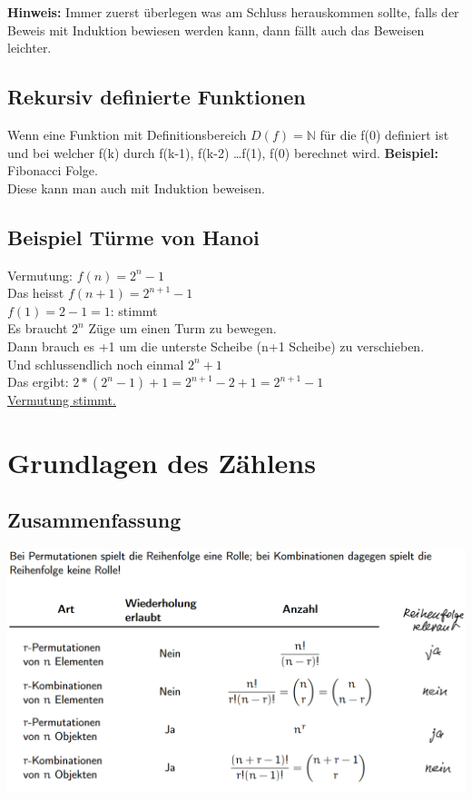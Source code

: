\documentclass[12pt]{scrartcl}
\begin{document}
\textbf{Hinweis:} Immer zuerst überlegen was am Schluss herauskommen sollte, falls der Beweis mit Induktion
bewiesen werden kann, dann fällt auch das Beweisen leichter.


\subsection{Rekursiv definierte Funktionen}
Wenn eine Funktion mit Definitionsbereich $D(f) = \mathbb{N}$ für die f(0) definiert ist und
bei welcher f(k) durch f(k-1), f(k-2) \dots f(1), f(0) berechnet wird.
\textbf{Beispiel:} Fibonacci Folge.\\

Diese kann man auch mit Induktion beweisen.


\subsection{Beispiel Türme von Hanoi}
Vermutung: $f(n) = 2^n - 1$\\
Das heisst $f(n+1) = 2^{n+1} - 1$\\


$f(1) = 2 - 1 = 1$: stimmt\\
Es braucht $2^n$ Züge um einen Turm zu bewegen.\\
Dann brauch es +1 um die unterste Scheibe (n+1 Scheibe) zu verschieben.\\
Und schlussendlich noch einmal $2^n + 1$\\
Das ergibt: $2* (2^n-1) + 1 = 2^{n+1} - 2 + 1 = 2^{n+1} - 1$ \\
\underline{Vermutung stimmt.}

\section{Grundlagen des Zählens}
\subsection{Zusammenfassung}
\includegraphics[width=15cm]{img/wahrscheinlichkeiten.png}
\end{document}
